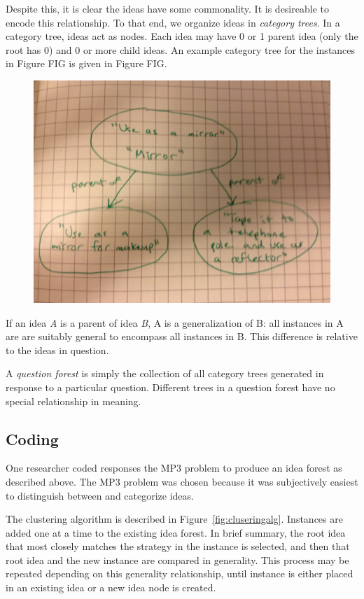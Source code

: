 Despite this, it is clear the ideas have some commonality. It is desireable to encode this relationship. To that end, we organize ideas in \emph{category trees}. In a category tree, ideas act as nodes. Each idea may have 0 or 1 parent idea (only the root has 0) and 0 or more child ideas. An example category tree for the instances in Figure FIG is given in Figure FIG.

\begin{figure}[!h]
    \centering
    \includegraphics[width=0.9\columnwidth]{sample_category_tree}
\end{figure}

If an idea \emph{A} is a parent of idea \emph{B}, A is a generalization of B: all instances in A are are suitably general to encompass all instances in B. This difference is relative to the ideas in question.

A \emph{question forest} is simply the collection of all category trees generated in response to a particular question. Different trees in a question forest have no special relationship in meaning.

\subsection{Coding}

One researcher coded responses the MP3 problem to produce an idea forest as described above. The MP3 problem was chosen because it was subjectively easiest to distinguish between and categorize ideas.

The clustering algorithm is described in Figure~\ref{fig:cluseringalg}. Instances are added one at a time to the existing idea forest. In brief summary, the root idea that most closely matches the strategy in the instance is selected, and then that root idea and the new instance are compared in generality. This process may be repeated depending on this generality relationship, until instance is either placed in an existing idea or a new idea node is created.

